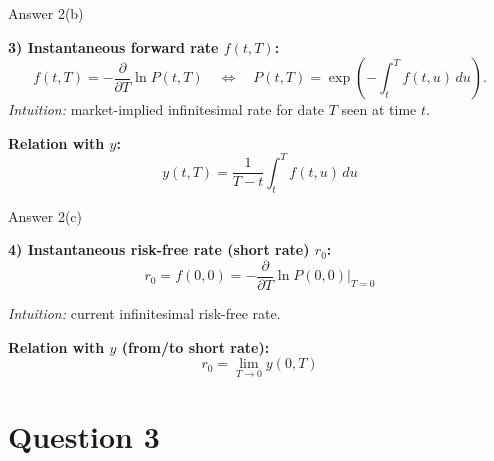 \documentclass[compress]{beamer}
\begin{document}
\begin{frame}{Answer 2(b)}
    {\small

	\vspace{1em}

    \textbf{3) Instantaneous forward rate $f(t,T)$:}
    \[
        f(t,T)= -\frac{\partial}{\partial T}\ln P(t,T)
        \quad\Longleftrightarrow\quad
        P(t,T)=\exp\!\left(-\int_t^T f(t,u)\,du\right).
    \]
    \textit{Intuition:} market-implied infinitesimal rate for date $T$ seen at time $t$.

	\vspace{1em}

    \textbf{Relation with $y$:}
    \[
        y(t,T)=\frac{1}{T-t}\int_t^T f(t,u)\,du
    \]
    }

\end{frame}

\begin{frame}{Answer 2(c)}
    {\small
    \vspace{1em}

    \textbf{4) Instantaneous risk-free rate (short rate) $r_0$:}
    \[
        r_0=f(0,0)= -\frac{\partial}{\partial T}\ln P(0,0)\Big|_{T=0}
    \]

	\vspace{1em}

    \textit{Intuition:} current infinitesimal risk-free rate. 

	\vspace{1em}

    \textbf{Relation with $y$ (from/to short rate):}
    \[
        r_0=\lim_{T\rightarrow 0} y(0,T)\] }
\end{frame}


\section{Question 3}
\end{document}
